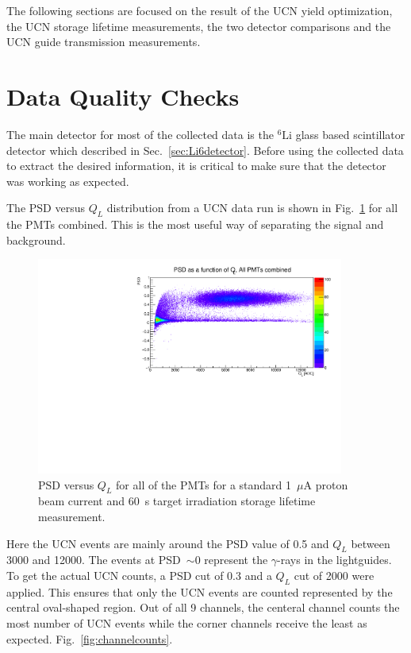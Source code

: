 The following sections are focused on the result of the UCN yield
optimization, the UCN storage lifetime measurements, the two detector
comparisons and the UCN guide transmission measurements.


\section {Data Quality Checks}
The main detector for most of the collected data is the
$^6\mathrm{Li}$ glass based scintillator detector which described in
Sec.~\ref{sec:Li6detector}. Before using the collected data to
extract the desired information, it is critical to make sure that the
detector was working as expected.

The PSD versus $Q_L$ distribution from a UCN data run is shown in
Fig.~\ref{fig:psd_vs_ql} for all the PMTs combined. This is the most useful
way of separating the signal and background.
\begin{figure}[h!]
  \centering
  \includegraphics[width=0.9\textwidth]{PSD_vs_QL.pdf}
  \caption{PSD versus $Q_L$ for all of the PMTs for a standard
    1~$\mu$A proton beam current and 60~s target irradiation storage
    lifetime measurement. }
  \label{fig:psd_vs_ql}
\end{figure}
Here the UCN events are mainly around the PSD value of 0.5 and $Q_L$
between 3000 and 12000. The events at PSD~$\sim 0$ represent the
$\gamma$-rays in the lightguides. To get the actual UCN counts, a PSD
cut of 0.3 and a $Q_L$ cut of 2000 were applied. This ensures that
only the UCN events are counted represented by the central oval-shaped
region. Out of all 9 channels, the centeral channel counts the most
number of UCN events while the corner channels receive the least as
expected. Fig.~\ref{fig:channelcounts}.

